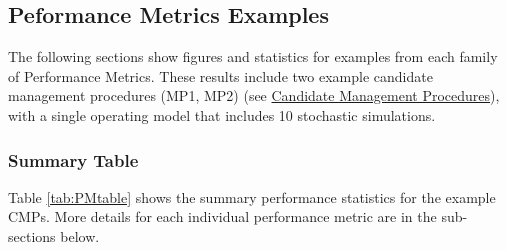\documentclass[
]{article}
\begin{document}
\hypertarget{peformance-metrics-examples}{%
\subsection{Peformance Metrics Examples}\label{peformance-metrics-examples}}

The following sections show figures and statistics for examples from each family of Performance Metrics. These results include two example candidate management procedures (MP1, MP2) (see \protect\hyperlink{CMPs}{Candidate Management Procedures}), with a single operating model that includes 10 stochastic simulations.

\hypertarget{summary-table}{%
\subsubsection{Summary Table}\label{summary-table}}

Table \ref{tab:PMtable} shows the summary performance statistics for the example CMPs. More details for each individual performance metric are in the sub-sections below.
\end{document}
